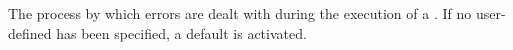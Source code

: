 \item[Event Handling]{
The process by which errors are dealt with during
the execution of a \gdsuite{}. If no user-defined \gdehandler 
has been specified, 
a default \gdehandler is activated. 
}
